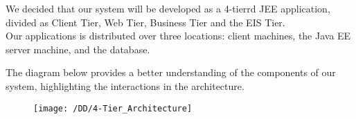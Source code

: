 
We decided that our system will be developed as a 4-tierrd JEE application, divided as Client Tier, Web Tier, Business Tier and the EIS Tier. 
\\Our applications is distributed over three locations: client machines, the Java EE server machine, and the database.


The diagram below provides a better understanding of the components of our system, highlighting the interactions in the architecture.
\begin{figure}[!ht]
  \centering
  \vspace{0.2cm}
  \texttt{[image: /DD/4-Tier\_Architecture]}\\
  \vspace{0.4cm}
  \label{fig:4-Tier_Architecture} 
\end{figure}